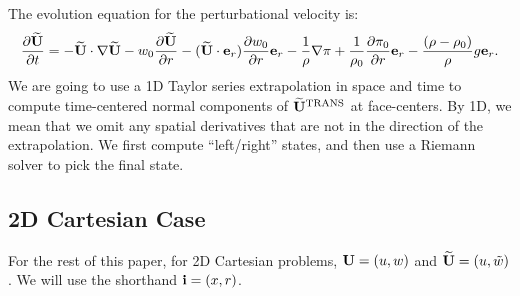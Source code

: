 \documentclass[11pt]{article}
\def\trans {\rm TRANS}
\def\eb    {{\bf e}}
\def\ib    {{\bf i}}
\def\Ub    {{\bf U}}
\def\Ubt   {\widetilde{\bf U}}
\def\wt    {\tilde{w}}
\begin{document}
The evolution equation for the perturbational velocity is:
\begin{equation}
\frac{\partial\Ubt}{\partial t} = -\Ubt\cdot\nabla\Ubt - w_0\frac{\partial\Ubt}{\partial r} - (\Ubt\cdot\eb_r)\frac{\partial w_0}{\partial r}\eb_r - \frac{1}{\rho}\nabla\pi + \frac{1}{\rho_0}\frac{\partial\pi_0}{\partial r}\eb_r - \frac{(\rho-\rho_0)}{\rho}g\eb_r.\label{Perturbational Velocity Equation}
\end{equation}
We are going to use a 1D Taylor series extrapolation in space and time to compute time-centered normal components of $\Ubt^{\trans}$ at face-centers.  By 1D, we mean that we omit any spatial derivatives that are not in the direction of the extrapolation.  We first compute ``left/right'' states, and then use a Riemann solver to pick the final state.
\subsection{2D Cartesian Case}
For the rest of this paper, for 2D Cartesian problems, $\Ub = (u,w)$ and $\Ubt = (u,\wt)$.  We will use the shorthand $\ib = (x,r)$.\\
\end{document}
